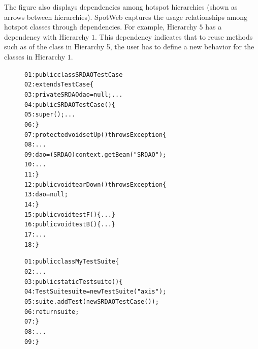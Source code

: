 The figure also displays dependencies among hotspot hierarchies
(shown as arrows between hierarchies). SpotWeb captures the
usage relationships among hotspot classes through dependencies.
For example, Hierarchy $5$ has a
 dependency with Hierarchy $1$. This
dependency indicates that to reuse methods such as 
of the class  in Hierarchy 5, the user has to
define a new behavior for the classes in Hierarchy $1$.

\begin{figure}[t]
\begin{CodeOut}
\begin{alltt}
01:public class SRDAOTestCase 
02:\hspace*{0.4in}extends TestCase \{
03:\hspace*{0.1in}private SRDAO dao = null;...
04:\hspace*{0.1in}public SRDAOTestCase() \{
05:\hspace*{0.3in}super(); ... 
06:\hspace*{0.1in}\}
07:\hspace*{0.1in}protected void setUp() throws Exception \{
08:\hspace*{0.3in}...
09:\hspace*{0.3in}dao = (SRDAO)context.getBean("SRDAO");
10:\hspace*{0.3in}...
11:\hspace*{0.1in}\}
12:\hspace*{0.1in}public void tearDown() throws Exception \{
13:\hspace*{0.3in}dao = null; 
14:\hspace*{0.1in}\}
15:\hspace*{0.1in}public void testF() \{ ... \}
16:\hspace*{0.1in}public void testB() \{ ... \}
17:\hspace*{0.1in}...
18:\}
\end{alltt}
\end{CodeOut}
\begin{CodeOut}
\begin{alltt}
01:public class MyTestSuite \{ 
02:\hspace*{0.1in}...
03:\hspace*{0.1in}public static Test suite() \{
04:\hspace*{0.3in}TestSuite suite = new TestSuite("axis");
05:\hspace*{0.3in}suite.addTest(new SRDAOTestCase());
06:\hspace*{0.3in}return suite;
07:\hspace*{0.1in}\}
08:\hspace*{0.1in}...
09:\}
\end{alltt}
\end{CodeOut}
\end{figure}

